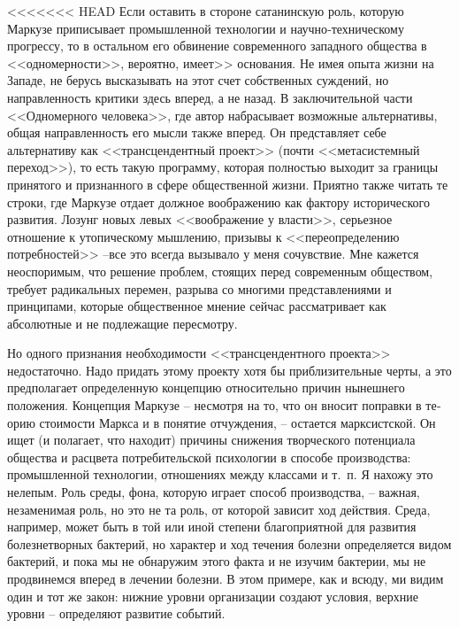 \documentclass{book}
\begin{document}
{<<<<<<< HEAD
Если оставить в стороне сатанинскую роль, которую Маркузе приписывает промышленной технологии и научно‑техниче­скому прогрессу, то в остальном его обвинение современного западного общества в <<одномерности>>, вероятно, имеет>> осно­вания. Не имея опыта жизни на Западе, не берусь высказывать на этот счет собственных суждений, но направленность критики здесь вперед, а не назад. В заключительной части <<Одномерно­го человека>>, где автор набрасывает возможные альтернативы, общая направленность его мысли также вперед. Он представ­ляет себе альтернативу как <<трансцендентный проект>> (почти <<метасистемный переход>>), то есть такую программу, кото­рая полностью выходит за границы принятого и признанного в сфере общественной жизни. Приятно также читать те строки, где Маркузе отдает должное воображению как фактору исто­рического развития. Лозунг новых левых <<воображение у власти>>, серьезное отношение к утопическому мышлению, призывы к <<переопределению потребностей>> --все это всегда вызывало у меня сочувствие. Мне кажется неоспоримым, что решение проблем, стоящих перед современным обществом, требует радикальных перемен, разрыва со многими представ­лениями и принципами, которые общественное мнение сейчас рассматривает как абсолютные и не подлежащие пересмотру.

Но одного признания необходимости <<трансцендентного проекта>> недостаточно. Надо придать этому проекту хотя бы приблизительные черты, а это предполагает определенную кон­цепцию относительно причин нынешнего положения. Концеп­ция Маркузе -- несмотря на то, что он вносит поправки в те­орию стоимости Маркса и в понятие отчуждения, -- остается марксистской. Он ищет (и полагает, что находит) причины снижения творческого потенциала общества и расцвета потре­бительской психологии в способе производства: промышлен­ной технологии, отношениях между классами и т.~п. Я нахожу это нелепым. Роль среды, фона, которую играет способ произ­водства, -- важная, незаменимая роль, но это не та роль, от ко­торой зависит ход действия. Среда, например, может быть в той или иной степени благоприятной для развития болезнетвор­ных бактерий, но характер и ход течения болезни определяется видом бактерий, и пока мы не обнаружим этого факта и не изучим бактерии, мы не продвинемся вперед в лечении болезни. В этом примере, как и всюду, ми видим один и тот же закон: нижние уровни организации создают условия, верхние уровни -- определяют развитие событий.

}
\end{document}
